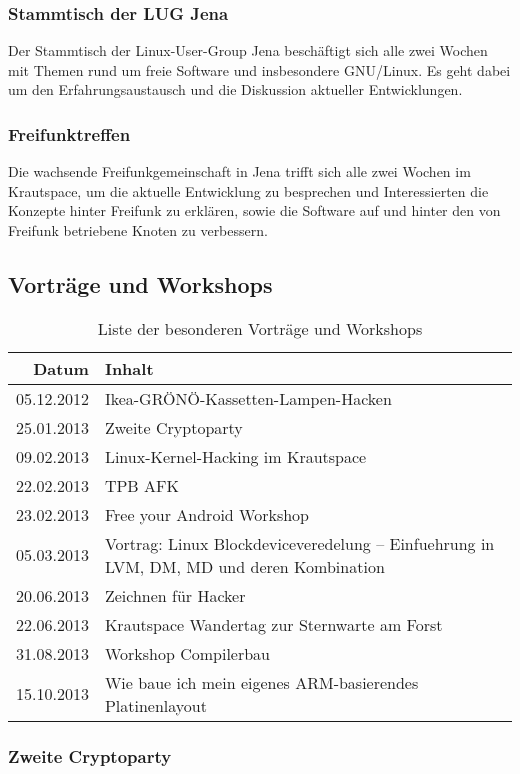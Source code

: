 \documentclass[10pt,DIV16]{scrartcl}
\begin{document}
\subsubsection{Stammtisch der LUG Jena}

Der Stammtisch der Linux-User-Group Jena beschäftigt sich alle zwei Wochen 
mit Themen rund um freie Software und insbesondere GNU/Linux. Es geht dabei 
um den Erfahrungsaustausch und die Diskussion aktueller Entwicklungen. 

\subsubsection{Freifunktreffen}

Die wachsende Freifunkgemeinschaft in Jena trifft sich alle zwei Wochen 
im Krautspace, um die aktuelle Entwicklung zu besprechen und 
Interessierten die Konzepte hinter Freifunk zu erklären, sowie die 
Software auf und hinter den von Freifunk betriebene Knoten zu 
verbessern.

\subsection{Vorträge und Workshops}

\begin{table}[h]
\begin{tabular}{r|l}
	\textbf{Datum} & \textbf{Inhalt} \\ \hline{}
	05.12.2012 & Ikea-GRÖNÖ-Kassetten-Lampen-Hacken\\
    25.01.2013 & Zweite Cryptoparty\\
	09.02.2013 & Linux-Kernel-Hacking im Krautspace\\
	22.02.2013 & TPB AFK\\
	23.02.2013 & Free your Android Workshop\\
	05.03.2013 & Vortrag: Linux Blockdeviceveredelung -- Einfuehrung in LVM, DM, MD und deren Kombination\\
	20.06.2013 & Zeichnen für Hacker\\
	22.06.2013 & Krautspace Wandertag zur Sternwarte am Forst\\
	31.08.2013 & Workshop Compilerbau\\
	15.10.2013 & Wie baue ich mein eigenes ARM-basierendes Platinenlayout
	\end{tabular}
	\caption{Liste der besonderen Vorträge und Workshops}
\end{table}

\subsubsection{Zweite Cryptoparty}
\end{document}
